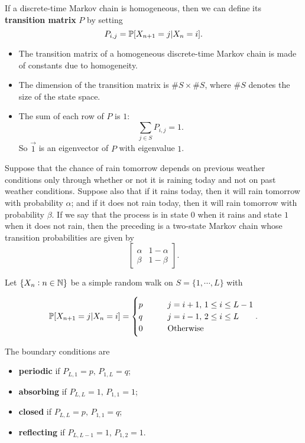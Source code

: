 \begin{definition}
    If a discrete-time Markov chain is homogeneous, then we can define its \textbf{transition matrix} $P$ by setting
    $$P_{i,j} = \mathbb{P}[X_{n+1} = j | X_n = i].$$
\end{definition}

\begin{itemize}
    \item The transition matrix of a homogeneous discrete-time Markov chain is made of constants due to homogeneity.
    \item The dimension of the transition matrix is $\#S \times \#S$, where $\#S$ denotes the size of the state space.
    \item The sum of each row of $P$ is $1$: $$\sum_{j \in S} P_{i,j} = 1.$$ So $\vec{1}$ is an eigenvector of $P$ with eigenvalue $1$.
\end{itemize}

\begin{example}\label{example 4.1}
    Suppose that the chance of rain tomorrow
    depends on previous weather conditions only through whether or not it is raining today
    and not on past weather conditions. Suppose also that if it rains today, then it will rain
    tomorrow with probability $\alpha$; and if it does not rain today, then it will rain tomorrow
    with probability $\beta$.
    If we say that the process is in state $0$ when it rains and state $1$ when it does not
    rain, then the preceding is a two-state Markov chain whose transition probabilities are
    given by
    $$
    \begin{bmatrix}
        \alpha & 1-\alpha \\ 
        \beta & 1-\beta
    \end{bmatrix}.
    $$
\end{example}

\begin{example}
    Let $\{X_n: n \in \mathbb{N}\}$ be a simple random walk on $S = \{1, \cdots, L\}$ with

    $$
    \mathbb{P}[X_{n+1} = j | X_n = i] = 
    \begin{cases}
        p & \qquad j = i+1,\, 1 \le i \le L-1 \\ 
        q & \qquad j = i-1,\, 2 \le i \le L \\ 
        0 & \qquad \text{Otherwise}
    \end{cases}.
    $$

    The boundary conditions are 
    \begin{itemize}
        \item \textbf{periodic} if $P_{L,1} = p,\, P_{1, L} = q$;
        \item \textbf{absorbing} if $P_{L,L} = 1,\, P_{1,1} = 1$;
        \item \textbf{closed} if $P_{L,L} = p,\, P_{1,1} = q$;
        \item \textbf{reflecting} if $P_{L, L-1} = 1$, $P_{1, 2} = 1$.
    \end{itemize}
\end{example}

